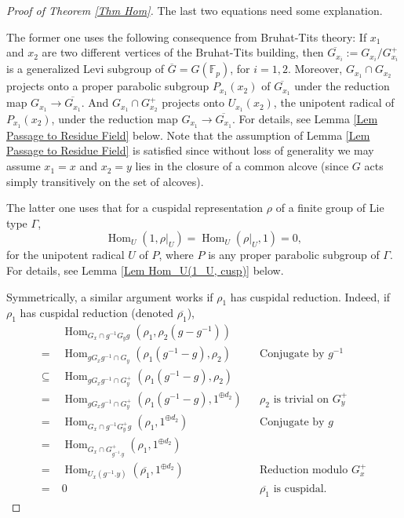 \documentclass{article}
\newcommand{\Hom}{\operatorname{Hom}}
\begin{document}
\begin{proof}[Proof of Theorem \ref{Thm Hom}]
		The last two equations need some explanation. 
		
		The former one uses the following consequence from Bruhat-Tits theory: If $x_1$ and $x_2$ are two different vertices of the Bruhat-Tits building, then $\overline{G_{x_i}}:=G_{x_i}/G_{x_i}^+$ is a generalized Levi subgroup of $\overline{G}=G(\mathbb{F}_p)$, for $i=1, 2$. Moreover, $G_{x_1} \cap G_{x_2}$ projects onto a proper parabolic subgroup $P_{x_1}(x_2)$ of $\overline{G_{x_1}}$ under the reduction map $G_{x_1} \to \overline{G_{x_1}}$. And $G_{x_1} \cap G_{x_2}^+$ projects onto $U_{x_1}(x_2)$, the unipotent radical of $P_{x_1}(x_2)$, under the reduction map $G_{x_1} \to \overline{G_{x_1}}$. For details, see Lemma \ref{Lem Passage to Residue Field} below. Note that the assumption of Lemma \ref{Lem Passage to Residue Field} is satisfied since without loss of generality we may assume $x_1=x$ and $x_2=y$ lies in the closure of a common alcove (since $G$ acts simply transitively on the set of alcoves).
		
		The latter one uses that for a cuspidal representation $\rho$ of a finite group of Lie type $\Gamma$, 
		$$\Hom_U(1, \rho|_U)=\Hom_U(\rho|_U, 1)=0,$$
		for the unipotent radical $U$ of $P$, where $P$ is any proper parabolic subgroup of $\Gamma$. For details, see Lemma \ref{Lem Hom_U(1_U, cusp)} below.
		
		Symmetrically, a similar argument works if $\rho_1$ has cuspidal reduction. Indeed, if $\rho_1$ has cuspidal reduction (denoted $\overline{\rho_1}$),
		\begin{align*}    	
			& \Hom_{G_x \cap g^{-1}G_yg}\left(\rho_1, \rho_2(g-g^{-1})\right) \\
			=\;& \Hom_{gG_xg^{-1} \cap G_y}\left(\rho_1(g^{-1}-g), \rho_2\right) && \text{Conjugate by $g^{-1}$}\\ 
			\subseteq\;& \Hom_{gG_xg^{-1} \cap G_y^+}\left(\rho_1(g^{-1}-g), \rho_2\right) && %
			\\
			=\;& \Hom_{gG_xg^{-1} \cap G_y^+}(\rho_1(g^{-1}-g), 1^{\oplus d_2}) && \text{$\rho_2$ is trivial on $G_y^+$ }\\
			=\;& \Hom_{G_x \cap g^{-1}G_y^+g}(\rho_1, 1^{\oplus d_2}) && \text{Conjugate by $g$}\\
			=\;& \Hom_{G_x \cap G_{g^{-1}.y}^+}(\rho_1, 1^{\oplus d_2}) && \\
			=\;& \Hom_{U_x(g^{-1}.y)}(\overline{\rho_1}, 1^{\oplus d_2}) && \text{Reduction modulo $G_x^+$}\\
			=\;& 0 && \text{$\overline{\rho_1}$ is cuspidal. }
		\end{align*}
		
	\end{proof}
	
\end{document}
